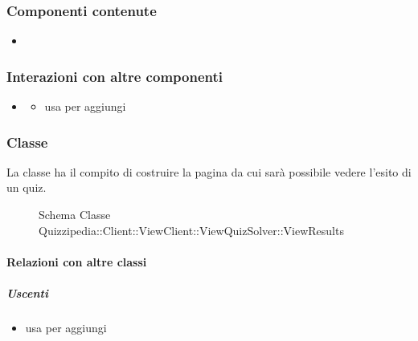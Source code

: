 \subsubsection{Componenti contenute}
\begin{itemize}
\item {}
\end{itemize}
\subsubsection{Interazioni con altre componenti}
\begin{itemize}
\item {}
\begin{itemize}
\item usa  per aggiungi
\end{itemize}
\end{itemize}
\subsubsection{Classe }
La classe ha il compito di costruire la pagina da cui sarà possibile vedere l'esito di un quiz.
\begin{figure}[H]
\centering
\noindent{}
\caption[Schema Classe ViewResults]{Schema Classe Quizzipedia::Client::ViewClient::ViewQuizSolver::ViewResults}
\end{figure}
\paragraph{Relazioni con altre classi}
\subparagraph{Uscenti}
\begin{itemize}
\item usa  per aggiungi
\end{itemize}
